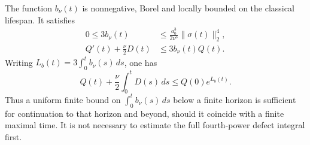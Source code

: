 \begin{theorem}
\label{sd:form-clock}
The function $b_\nu(t)$ is nonnegative, Borel and locally bounded on the
classical lifespan. It satisfies
\begin{align}
 0\le3b_\nu(t)&\le\frac{a_0^3}{2\nu^3}\|\sigma(t)\|_2^4,
       \label{sd:form-domination}\\
 Q'(t)+\frac\nu2D(t)&\le3b_\nu(t)Q(t).\label{sd:form-diff}
\end{align}
Writing $L_b(t)=3\int_0^t b_\nu(s)\,ds$, one has
\begin{equation}\label{sd:form-budget}
 Q(t)+\frac\nu2\int_0^tD(s)\,ds\le Q(0)e^{L_b(t)}.
\end{equation}
Thus a uniform finite bound on $\int_0^t b_\nu(s)\,ds$ below a finite
horizon is sufficient for continuation to that horizon and beyond, should
it coincide with a finite maximal time. It is not necessary to estimate
the full fourth-power defect integral first.
\end{theorem}
